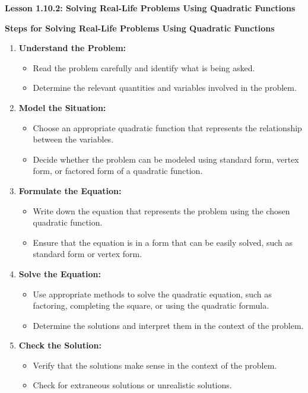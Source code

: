\begin{center}
\textbf{Lesson 1.10.2: Solving Real-Life Problems Using Quadratic Functions}
\end{center}

\vspace*{1ex}

\textbf{Steps for Solving Real-Life Problems Using Quadratic Functions}
\begin{enumerate}
    \item \textbf{Understand the Problem:}
    \begin{itemize}
        \item Read the problem carefully and identify what is being asked.
        \item Determine the relevant quantities and variables involved in the problem.
    \end{itemize}
    
    \item \textbf{Model the Situation:}
    \begin{itemize}
        \item Choose an appropriate quadratic function that represents the relationship between the variables.
        \item Decide whether the problem can be modeled using standard form, vertex form, or factored form of a quadratic function.
    \end{itemize}
    
    \item \textbf{Formulate the Equation:}
    \begin{itemize}
        \item Write down the equation that represents the problem using the chosen quadratic function.
        \item Ensure that the equation is in a form that can be easily solved, such as standard form or vertex form.
    \end{itemize}
    
    \item \textbf{Solve the Equation:}
    \begin{itemize}
        \item Use appropriate methods to solve the quadratic equation, such as factoring, completing the square, or using the quadratic formula.
        \item Determine the solutions and interpret them in the context of the problem.
    \end{itemize}
    
    \item \textbf{Check the Solution:}
    \begin{itemize}
        \item Verify that the solutions make sense in the context of the problem.
        \item Check for extraneous solutions or unrealistic solutions.
    \end{itemize}
\end{enumerate}

